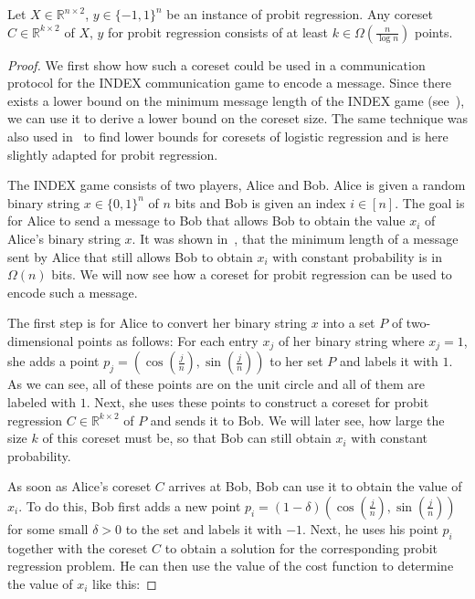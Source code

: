 \begin{theorem}
    Let $X \in \mathbb{R}^{n \times 2}$, $y \in \{-1, 1\}^n$ be
    an instance of probit regression.
    Any coreset $C \in \mathbb{R}^{k \times 2}$ of $X$, $y$
    for probit regression consists of
    at least $k \in \Omega\left(\frac{n}{\log{n}}\right)$ points.
\end{theorem}
\begin{proof}
    We first show how such a coreset could be used in a
    communication protocol for the INDEX communication game
    to encode a message.
    Since there exists a lower bound on the minimum
    message length of the INDEX game (see~\cite{index}),
    we can use it to derive a lower bound on the
    coreset size.
    The same technique was also used in~\cite{on-coresets} to find
    lower bounds for coresets of logistic regression and is here slightly
    adapted for probit regression.

    The INDEX game consists of two players, Alice and Bob.
    Alice is given a random binary string $x \in \{0, 1\}^n$ of $n$ bits
    and Bob is given an index $i \in [n]$.
    The goal is for Alice to send a message to Bob that allows
    Bob to obtain the value $x_i$ of Alice's binary string $x$.
    It was shown in~\cite{index}, that the minimum length of a message
    sent by Alice that still allows Bob to obtain $x_i$ with
    constant probability is in $\Omega(n)$ bits.
    We will now see how a coreset for probit regression can be used
    to encode such a message.

    The first step is for Alice to convert her binary string $x$ into
    a set $P$ of two-dimensional points as follows:
    For each entry $x_j$ of her binary string where $x_j = 1$, she adds
    a point $p_j = \left( \cos{\left(\frac{j}{n}\right)},
        \sin{\left(\frac{j}{n}\right)} \right)$
    to her set $P$ and labels it with $1$.
    As we can see, all of these points are on the unit circle and all
    of them are labeled with $1$.
    Next, she uses these points to construct a coreset for probit regression
    $C \in \mathbb{R}^{k \times 2}$ of $P$
    and sends it to Bob. We will later see, how
    large the size $k$ of this coreset must be, so that Bob can still
    obtain $x_i$ with constant probability.

    As soon as Alice's coreset $C$ arrives at Bob, Bob can use it to
    obtain the value of $x_i$.
    To do this, Bob first adds a new point $p_i = (1 - \delta)
        \left( \cos{\left(\frac{j}{n}\right)},
        \sin{\left(\frac{j}{n}\right)} \right)$
    for some small $\delta > 0$
    to the set and labels it with $-1$.
    Next, he uses his point $p_i$ together with the coreset $C$ to
    obtain a solution for the corresponding probit regression problem.
    He can then use the value of the cost function to determine the value
    of $x_i$ like this:


\end{proof}
